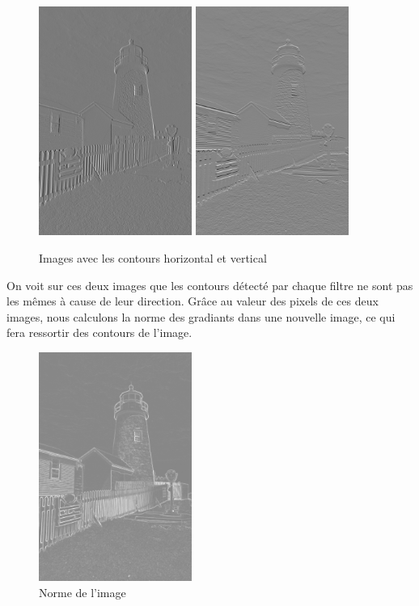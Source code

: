 \documentclass[a4paper,11pt]{article}
\begin{document}
  \begin{figure}[H]
  \center
   \includegraphics[width=5cm]{../lighthouse_8bits_grad_x.png}
   \includegraphics[width=5cm]{../lighthouse_8bits_grad_y.png}
   \caption{Images avec les contours horizontal et vertical}
  \end{figure}

  On voit sur ces deux images que les contours détecté par chaque filtre ne sont pas les mêmes
  à cause de leur direction. Grâce au valeur des pixels de ces deux images, nous calculons la norme
  des gradiants dans une nouvelle image, ce qui fera ressortir des contours de l'image.

  \begin{figure}[H]
  \center
   \includegraphics[width=5cm]{../norme32.png}
   \caption{Norme de l'image}
  \end{figure}
  
\end{document}
